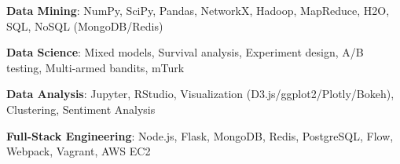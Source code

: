 \documentclass[margin,line]{resume}
\begin{document}
\begin{resume}
\vspace{-4mm}


\textbf{Data Mining}: NumPy, SciPy, Pandas, NetworkX, Hadoop, MapReduce, H2O, SQL, NoSQL (MongoDB/Redis) %

\vspace{-4mm}

\textbf{Data Science}: Mixed models, Survival analysis, Experiment design, A/B testing, Multi-armed bandits, mTurk %

\vspace{-4mm}

\textbf{Data Analysis}: Jupyter, RStudio, Visualization (D3.js/ggplot2/Plotly/Bokeh), Clustering, Sentiment Analysis %



\vspace{-4mm}


\textbf{Full-Stack Engineering}: Node.js, Flask, MongoDB, Redis, PostgreSQL, Flow, Webpack, Vagrant, AWS EC2 %









\end{resume}
\end{document}
